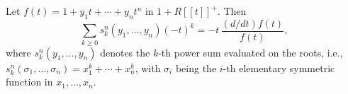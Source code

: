 Let $f(t) = 1 + y_1 t + \cdots + y_n t^n$ in $1 + R[[t]]^+$. Then
$$
\sum_{k \geq 0} s_k^n(y_1, \ldots, y_n)(-t)^k = -t\,\frac{(d/dt)f(t)}{f(t)},
$$
where $s_k^n(y_1, \ldots, y_n)$ denotes the $k$-th power sum evaluated on the roots, i.e., $s_k^n(\sigma_1, \ldots, \sigma_n) = x_1^k + \cdots + x_n^k$, with $\sigma_i$ being the $i$-th elementary symmetric function in $x_1, \ldots, x_n$.
